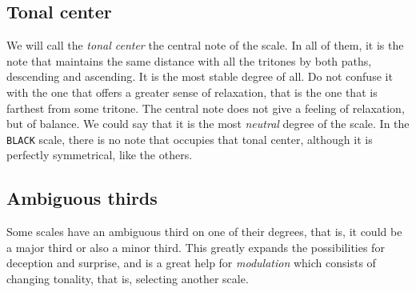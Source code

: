 \documentclass[]{report}
\begin{document}
\subsection{Tonal center}
We will call the \emph{tonal center} the central note of the scale. In all of them, it is the note that maintains the same distance with all the tritones by both paths, descending and ascending. It is the most stable degree of all. Do not confuse it with the one that offers a greater sense of relaxation, that is the one that is farthest from some tritone. The central note does not give a feeling of relaxation, but of balance. We could say that it is the most \emph{neutral} degree of the scale. In the \texttt{BLACK} scale, there is no note that occupies that tonal center, although it is perfectly symmetrical, like the others.
\subsection{Ambiguous thirds}
Some scales have an ambiguous third on one of their degrees, that is, it could be a major third or also a minor third. This greatly expands the possibilities for deception and surprise, and is a great help for \emph{modulation} which consists of changing tonality, that is, selecting another scale.
\end{document}
